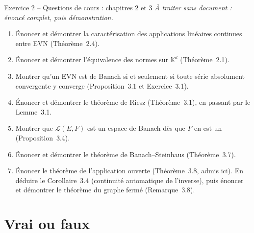 \documentclass[11pt,a4paper]{article}
\newcommand{\K}{\mathbb{K}}
\newcommand{\Lc}{\mathcal{L}}
\theoremstyle{definition}
\begin{document}
\begin{exo}{Exercice 2 -- Questions de cours : chapitres 2 et 3}
\emph{À traiter sans document : énoncé complet, puis démonstration.}
\begin{enumerate}[label=(\alph*)]
  \item Énoncer et démontrer la caractérisation des applications linéaires continues entre EVN (Théorème~2.4).
  \item Énoncer et démontrer l'équivalence des normes sur $\K^d$ (Théorème~2.1).
  \item Montrer qu'un EVN est de Banach si et seulement si toute série absolument convergente y converge (Proposition~3.1 et Exercice~3.1).
  \item Énoncer et démontrer le théorème de Riesz (Théorème~3.1), en passant par le Lemme~3.1.
  \item Montrer que $\Lc(E,F)$ est un espace de Banach dès que $F$ en est un (Proposition~3.4).
  \item Énoncer et démontrer le théorème de Banach--Steinhaus (Théorème~3.7).
  \item Énoncer le théorème de l'application ouverte (Théorème~3.8, admis ici). En déduire le Corollaire~3.4 (continuité automatique de l'inverse), puis énoncer et démontrer le théorème du graphe fermé (Remarque~3.8).
\end{enumerate}
\end{exo}

\section*{Vrai ou faux}
\end{document}
